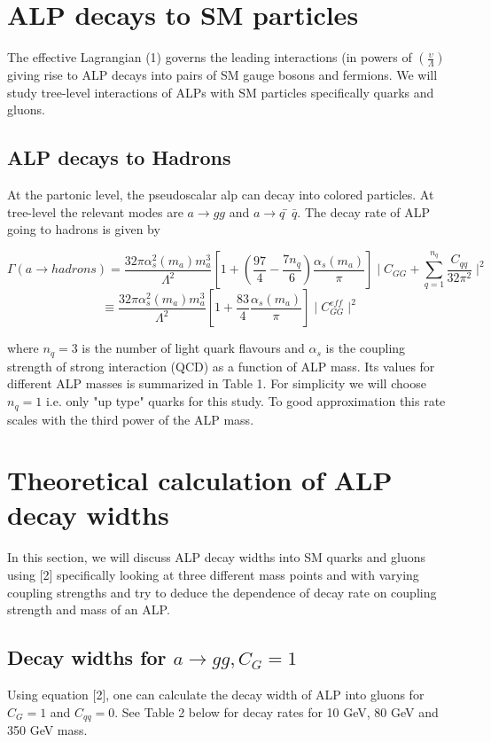 \documentclass[12pt,a4paper]{article}
\begin{document}
\section{ALP decays to SM particles}
The effective Lagrangian (1) governs the leading interactions (in powers of $(\frac{\upsilon}{\Lambda})$ giving rise to ALP decays into pairs of SM gauge bosons and fermions. We will study tree-level interactions of ALPs with SM particles specifically quarks and gluons.
\subsection{ALP decays to Hadrons}
At the partonic level, the pseudoscalar alp can decay into colored particles. At tree-level the relevant modes are $a \rightarrow g g$ and $a \rightarrow q ̄\bar q$. The decay rate of ALP going to hadrons is given by

\begin{equation}
\Gamma (a \rightarrow hadrons) = \frac{32 \pi \alpha_s^2(m_a) m_a^3}{\Lambda^2}[1 + (\frac{97}{4} - \frac{7n_q}{6}) \frac{\alpha_s(m_a)}{\pi}] \mid C_{GG} + \sum_{q=1}^{n_q} \frac{C_{qq}}{32 \pi^2} \mid ^2
\end{equation}
$$\equiv \frac{32 \pi \alpha_s^2(m_a) m_a^3}{\Lambda^2} [1 + \frac{83}{4} \frac{\alpha_s(m_a)}{\pi}] \mid C_{GG}^{eff} \mid ^2$$

where $n_q = 3$ is the number of light quark flavours and $\alpha_s$ is the coupling strength of strong interaction (QCD) as a function of ALP mass. Its values for different ALP masses is summarized in Table 1. For simplicity we will choose $n_q = 1$ i.e. only "up type" quarks for this study. To good approximation this rate scales with the third power of the ALP mass.  

\section{Theoretical calculation of ALP decay widths}
In this section, we will discuss ALP decay widths into SM quarks and gluons using [2] specifically looking at three different mass points and with varying coupling strengths and try to deduce the dependence of decay rate on coupling strength and mass of an ALP.
\subsection{Decay widths for $a \rightarrow g g, C_G = 1$}
Using equation [2], one can calculate the decay width of ALP into gluons for $C_G = 1$ and $C_{qq} = 0$. See Table 2 below for decay rates for 10 GeV, 80 GeV and 350 GeV mass.\\
\end{document}
